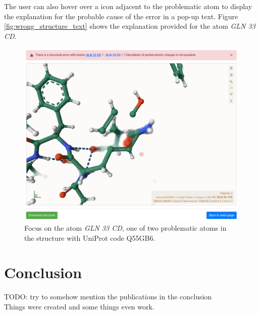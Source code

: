 \documentclass[
  digital,     %
  oneside,     %
  nosansbold,  %
  nocolorbold, %
  lof,         %
  lot,         %
]{fithesis4}
\begin{document}
The user can also hover over a icon adjacent to the problematic atom to display the explanation for the probable cause of the error in a pop-up text. Figure \ref{fig:wrong_structure_text} shows the explanation provided for the atom \textit{GLN 33 CD}.

\begin{figure}[htbp]
  \begin{center}
    \includegraphics[width=12cm]{figures/wrong_structure_focus.png}
  \end{center}
  \caption{Focus on the atom \textit{GLN 33 CD}, one of two problematic atoms in the structure with UniProt code Q55GB6.}
  \label{fig:wrong_structure_focus}
\end{figure}

\chapter*{Conclusion}

TODO: try to somehow mention the publications in the conclusion \\

Things were created and some things even work.

\printbibliography[heading=bibintoc]
\end{document}

